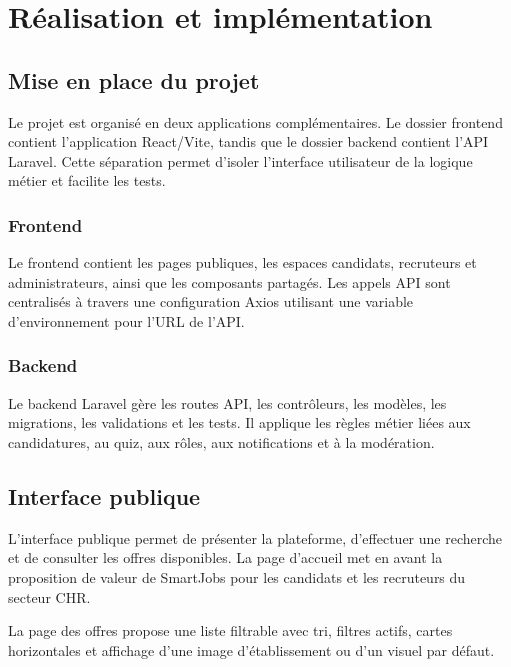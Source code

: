 \chapter{Réalisation et implémentation}

\section{Mise en place du projet}

\noindent
Le projet \projectName{} est organisé en deux applications complémentaires. Le dossier frontend contient l'application React/Vite, tandis que le dossier backend contient l'API Laravel. Cette séparation permet d'isoler l'interface utilisateur de la logique métier et facilite les tests.

\subsection{Frontend}

\noindent
Le frontend contient les pages publiques, les espaces candidats, recruteurs et administrateurs, ainsi que les composants partagés. Les appels API sont centralisés à travers une configuration Axios utilisant une variable d'environnement pour l'URL de l'API.

\subsection{Backend}

\noindent
Le backend Laravel gère les routes API, les contrôleurs, les modèles, les migrations, les validations et les tests. Il applique les règles métier liées aux candidatures, au quiz, aux rôles, aux notifications et à la modération.

\section{Interface publique}

\noindent
L'interface publique permet de présenter la plateforme, d'effectuer une recherche et de consulter les offres disponibles. La page d'accueil met en avant la proposition de valeur de SmartJobs pour les candidats et les recruteurs du secteur CHR.


\noindent
La page des offres propose une liste filtrable avec tri, filtres actifs, cartes horizontales et affichage d'une image d'établissement ou d'un visuel par défaut.

